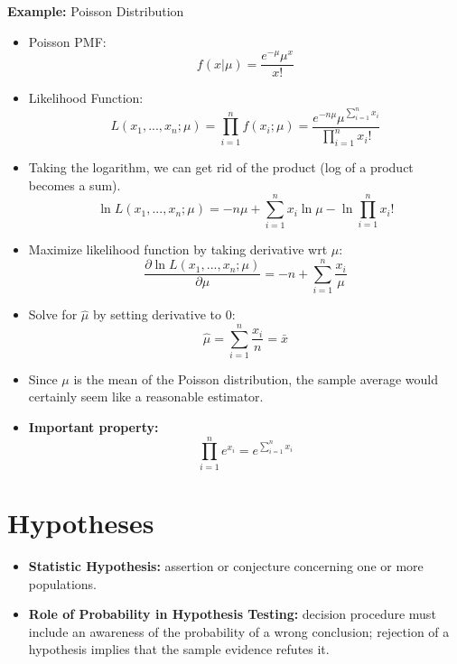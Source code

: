 \documentclass[10pt, letterpaper, twoside]{article}
\begin{document}
\begin{multicols}{2}
\textbf{Example:} Poisson Distribution
\begin{itemize}
    \item Poisson PMF:
    \begin{equation*}
        f(x|\mu) = \frac{e^{-\mu}\mu^x}{x!}
    \end{equation*}
    \item Likelihood Function:
    \begin{equation*}
        L(x_1, ..., x_n;\mu) = \prod_{i=1}^n f(x_i;\mu) = \frac{e^{-n\mu}\mu^{\sum_{i=1}^n x_i}}{\prod_{i=1}^nx_i!}
    \end{equation*}
    \item Taking the logarithm, we can get rid of the product (log of a product becomes a sum).
    \begin{equation*}
        \ln{L(x_1, ..., x_n;\mu)} = -n\mu + \sum_{i=1}^n x_i\ln{\mu} - \ln{\prod_{i=1}^nx_i!}
    \end{equation*}
    \item Maximize likelihood function by taking derivative wrt $\mu$:
    \begin{equation*}
        \frac{\partial\ln{L(x_1, ..., x_n;\mu)}}{\partial\mu} = -n + \sum_{i=1}^n\frac{x_i}{\mu}
    \end{equation*}
    \item Solve for $\hat{\mu}$ by setting derivative to 0:
    \begin{equation*}
        \hat{\mu} = \sum_{i=1}^n\frac{x_i}{n} = \bar{x}
    \end{equation*}
    \item Since $\mu$ is the mean of the Poisson distribution, the sample average would certainly seem like a reasonable estimator.
    \item \textbf{Important property:}
    \begin{equation*}
        \prod_{i=1}^ne^{x_i} = e^{\sum_{i=1}^nx_i}
    \end{equation*}
\end{itemize}

\vfill\pagebreak

\section{Hypotheses}

\begin{itemize}
     \item \textbf{Statistic Hypothesis:} assertion or conjecture concerning one or more populations.
     \item \textbf{Role of Probability in Hypothesis Testing:} decision procedure must include an awareness of the probability of a wrong conclusion; rejection of a hypothesis implies that the sample evidence refutes it.
\end{itemize}


\end{multicols}
\end{document}
